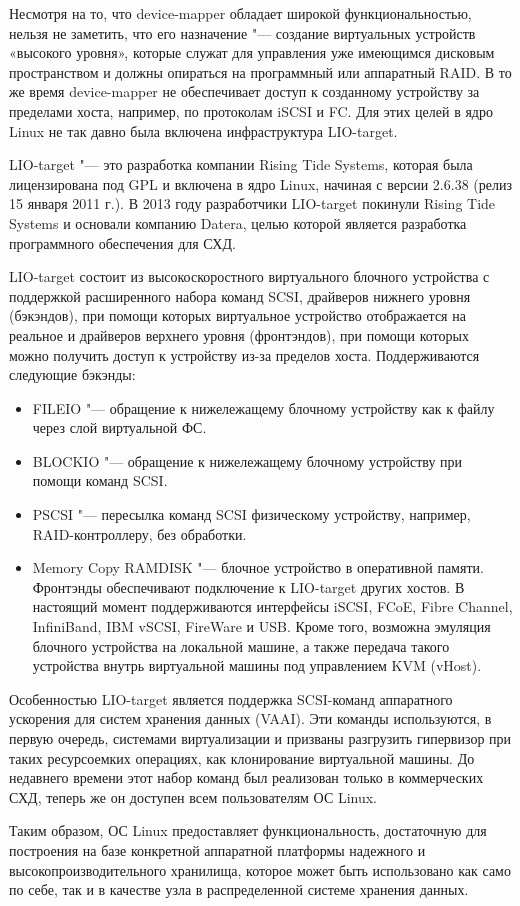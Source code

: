 \documentclass[10pt, a5paper]{article}
\begin{document}
Несмотря на то, что device-mapper обладает широкой функциональностью, нельзя не заметить, что его назначение "--- создание виртуальных устройств «высокого уровня», которые служат для управления уже имеющимся дисковым пространством и должны опираться на программный или аппаратный RAID. В то же время  device-mapper не обеспечивает доступ к созданному устройству за пределами хоста, например, по протоколам iSCSI и FC. Для этих целей в ядро Linux не так давно была включена инфраструктура LIO-target.

LIO-target "--- это разработка компании Rising Tide Systems, которая была лицензирована под  GPL и включена в ядро Linux, начиная с версии 2.6.38 (релиз 15 января 2011 г.). В 2013 году разработчики LIO-target покинули  Rising Tide Systems и основали компанию Datera, целью которой является разработка программного обеспечения для СХД.

LIO-target состоит из высокоскоростного виртуального блочного устройства с поддержкой расширенного набора команд SCSI, драйверов нижнего уровня (бэкэндов), при помощи которых виртуальное устройство отображается на реальное и драйверов верхнего уровня (фронтэндов), при помощи которых можно получить доступ к устройству из-за пределов хоста.
Поддерживаются следующие бэкэнды:

\begin{itemize}
  \item FILEIO "--- обращение к нижележащему блочному устройству как к файлу через слой виртуальной ФС.
  \item BLOCKIO "--- обращение к нижележащему блочному устройству при помощи команд SCSI.
  \item PSCSI "--- пересылка команд  SCSI физическому   устройству, например, RAID-контроллеру, без обработки.
  \item Memory Copy RAMDISK "--- блочное устройство в оперативной памяти.
Фронтэнды обеспечивают подключение к LIO-target других хостов. В настоящий момент поддерживаются интерфейсы iSCSI, FCoE, Fibre Channel, InfiniBand, IBM vSCSI, FireWare и USB. Кроме того, возможна эмуляция блочного устройства на локальной машине, а также передача такого устройства внутрь виртуальной машины под управлением \linebreak KVM (vHost).
\end{itemize}

Особенностью  LIO-target является поддержка SCSI-команд аппаратного ускорения для систем хранения данных (VAAI). Эти команды используются, в первую очередь, системами виртуализации и призваны разгрузить гипервизор при таких ресурсоемких операциях, как клонирование виртуальной машины. До недавнего времени этот набор команд был реализован только в коммерческих СХД, теперь же он доступен всем пользователям ОС Linux.

Таким образом, ОС Linux предоставляет функциональность, достаточную для построения на базе конкретной аппаратной платформы надежного и высокопроизводительного хранилища, которое может быть использовано как само по себе, так и в качестве узла в распределенной системе хранения данных.
\end{document}
